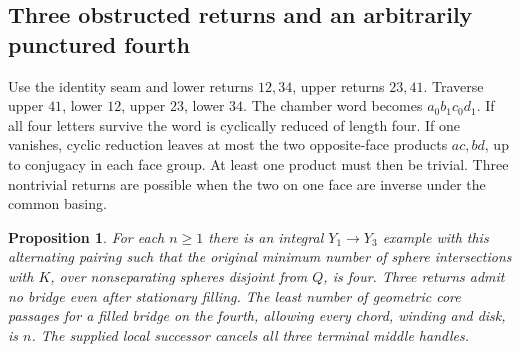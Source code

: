 \documentclass[11pt,letterpaper]{article}
\numberwithin{equation}{section}
\newtheorem{proposition}[theorem]{Proposition}
\theoremstyle{remark}
\begin{document}
\subsection{Three obstructed returns and an arbitrarily punctured fourth}
\label{sec:longitude-returns}
Use the identity seam and lower returns \(12,34\), upper returns \(23,41\).
Traverse upper \(41\), lower \(12\), upper \(23\), lower \(34\).
The chamber word becomes \(a_0 b_1 c_0 d_1\). If all four letters
survive the word is cyclically reduced of length four. If one vanishes,
cyclic reduction leaves at most the two opposite-face products \(ac,bd\),
up to conjugacy in each face group. At least one product must then be
trivial. Three nontrivial returns are possible when the two on one
face are inverse under the common basing.

\begin{proposition}\label{prop:arbitrary-punctures}
For each \(n\ge1\) there is an integral \(Y_1\to Y_3\) example with
this alternating pairing such that the original minimum number of sphere
intersections with \(K\), over nonseparating spheres disjoint from \(Q\),
is four. Three returns admit no bridge even after stationary filling.
The least number of geometric core passages for a filled bridge on the
fourth, allowing every chord, winding and disk, is \(n\). The supplied
local successor cancels all three terminal middle handles.
\end{proposition}
\end{document}
